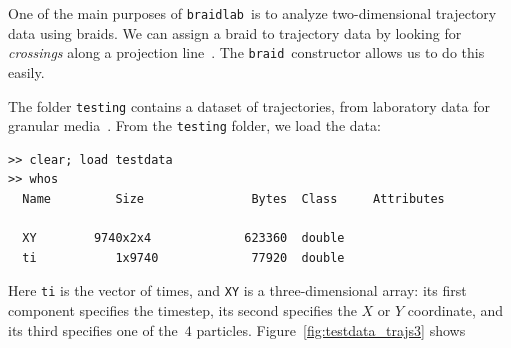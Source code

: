 \documentclass[12pt]{article}
\newcommand{\braidlab}{\texttt{braidlab}}%
\newcommand{\braid}{\texttt{braid}}%
\begin{document}
One of the main purposes of \braidlab\ is to analyze two-dimensional
trajectory data using braids.  We can assign a braid to trajectory
data by looking for \emph{crossings} along a projection
line~\citep{Thiffeault2005,Thiffeault2010}.  The \braid\ constructor
allows us to do this easily.

The folder \lstinline{testing} contains a dataset of trajectories,
from laboratory data for granular media~\cite{Puckett2012}.  From the
\lstinline{testing} folder, we load the data:
\begin{lstlisting}[frame=single,framerule=0pt]
>> clear; load testdata
>> whos
  Name         Size               Bytes  Class     Attributes

  XY        9740x2x4             623360  double              
  ti           1x9740             77920  double              
\end{lstlisting}
Here \lstinline{ti} is the vector of times, and \lstinline{XY} is a
three-dimensional array: its first component specifies the timestep,
its second specifies the $X$ or $Y$ coordinate, and its third
specifies one of the~$4$ particles.  Figure~\ref{fig:testdata_trajs3}
shows
%
\end{document}
